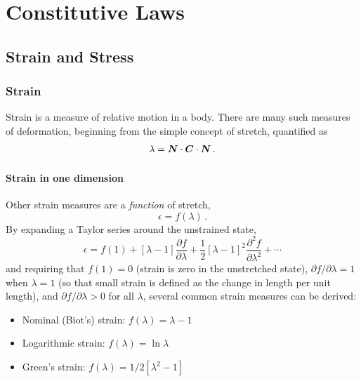 \documentclass[10pt,letterpaper,oneside]{report}
\newcommand{\ten}[1]{\mbox{\boldmath $#1$}{}}
\begin{document}
\chapter{Constitutive Laws}
\label{chap:const}

\section{Strain and Stress}

\subsection{Strain}
Strain is a measure of relative motion in a body.  There are many such measures of deformation, beginning from the simple concept of stretch, quantified as
\begin{equation}
\lambda = \ten{N} \cdot \ten{C} \cdot \ten{N} \, .
\end{equation}

\subsubsection{Strain in one dimension}
Other strain measures are a \emph{function} of stretch, 
\begin{equation}
\epsilon = f \left( \lambda \right) \, .
\end{equation}
By expanding a Taylor series around the unstrained state, 
\begin{equation}
\epsilon = f \left( 1 \right) + \left[ \lambda - 1 \right] \frac{\partial f}{\partial \lambda} + \frac{1}{2} \left[ \lambda - 1 \right]^2 \frac{\partial^2 f}{\partial \lambda^2} + \cdots
\end{equation}
and requiring that $f \left( 1 \right) = 0$ (strain is zero in the unstretched state), $\partial f / \partial \lambda = 1$ when $\lambda = 1$ (so that small strain is defined as the change in length per unit length), and $\partial f / \partial \lambda > 0$ for all $\lambda$, several common strain measures can be derived:
\begin{itemize}
\item Nominal (Biot's) strain: $ f \left( \lambda \right) = \lambda - 1$
\item Logarithmic strain: $ f \left( \lambda \right) = \ln \lambda$ 
\item Green's strain: $ f \left( \lambda \right) = 1 / 2 \left[ \lambda^2 - 1 \right]$
\end{itemize}
\end{document}

